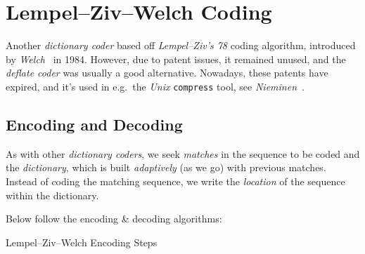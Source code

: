 \documentclass[a4paper, twocolumn]{article}
\begin{document}
    \section{Lempel--Ziv--Welch Coding} \label{sec:lempel_ziv_welch}

        Another \emph{dictionary coder} based off \emph{Lempel--Ziv's 78} coding algorithm, introduced by \emph{Welch}~\cite{welch1984technique} in 1984. However, due to patent issues, it remained unused, and the \emph{deflate coder} was usually a good alternative. Nowadays, these patents have expired, and it's used in e.g.\ the \emph{Unix} \texttt{compress} tool, see \emph{Nieminen}~\cite{nieminen2007efficient}.

        \subsection{Encoding and Decoding} \label{sec:lzw_encoding_decoding}

        As with other \emph{dictionary coders}, we seek \emph{matches} in the sequence to be coded and the \emph{dictionary}, which is built \emph{adaptively} (as we go) with previous matches. Instead of coding the matching sequence, we write the \emph{location} of the sequence within the dictionary.

        Below follow the encoding \& decoding algorithms:

        \begin{algorithm}
            \begin{algorithmic}
                    \ELSE
                    \ENDIF
                \ENDWHILE
            \end{algorithmic}
            \caption{Lempel--Ziv--Welch Encoding Steps}
            \label{alg:lzwz}
        \end{algorithm}
\end{document}
